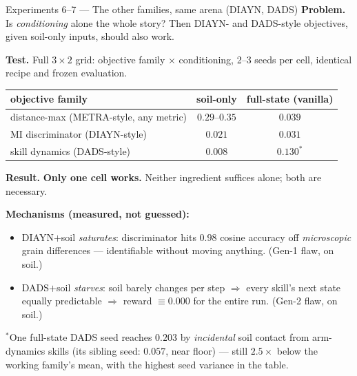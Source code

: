 \documentclass[aspectratio=169,11pt]{beamer}
\newcommand{\ok}[1]{\textcolor{okgreen}{#1}}
\newcommand{\bad}[1]{\textcolor{badred}{#1}}
\begin{document}
\begin{frame}{Experiments 6--7 --- The other families, same arena (DIAYN, DADS)}
\textbf{Problem.} Is \emph{conditioning} alone the whole story? Then DIAYN- and DADS-style objectives, given soil-only inputs, should also work.

\textbf{Test.} Full $3\times2$ grid: objective family $\times$ conditioning, 2--3 seeds per cell, identical recipe and frozen evaluation.

\begin{center}
\small
\begin{tabular}{lcc}
\toprule
\textbf{objective family} & \textbf{soil-only} & \textbf{full-state (vanilla)} \\
\midrule
distance-max (METRA-style, any metric) & \ok{$0.29$--$0.35$ \checkmark} & \bad{$0.039$ \texttimes} \\
MI discriminator (DIAYN-style) & \bad{$0.021$ \texttimes} & \bad{$0.031$ \texttimes} \\
skill dynamics (DADS-style) & \bad{$0.008$ \texttimes} & \bad{$0.130^{*}$ \texttimes} \\
\bottomrule
\end{tabular}
\end{center}

\textbf{Result.} \textbf{Only one cell works.} Neither ingredient suffices alone; both are necessary.

\textbf{Mechanisms (measured, not guessed):}
\begin{itemize}
  \item \bad{DIAYN$+$soil \emph{saturates}}: discriminator hits $0.98$ cosine accuracy off \emph{microscopic} grain differences --- identifiable without moving anything. (Gen-1 flaw, on soil.)
  \item \bad{DADS$+$soil \emph{starves}}: soil barely changes per step $\Rightarrow$ every skill's next state equally predictable $\Rightarrow$ reward $\equiv 0.000$ for the entire run. (Gen-2 flaw, on soil.)
\end{itemize}
{\scriptsize $^{*}$One full-state DADS seed reaches $0.203$ by \emph{incidental} soil contact from arm-dynamics skills (its sibling seed: $0.057$, near floor) --- still $2.5\times$ below the working family's mean, with the highest seed variance in the table.}
\end{frame}
\end{document}
